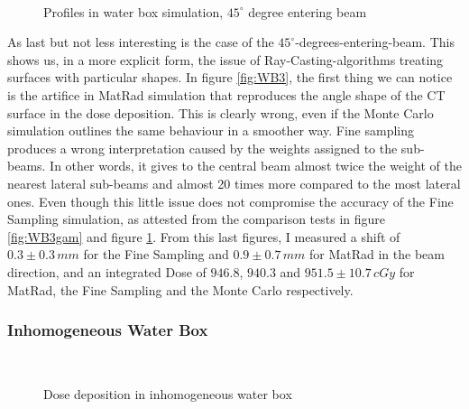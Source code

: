 \documentclass[12pt, a4paper, twoside]{book}
\begin{document}
\begin{figure}[!ht]
\centering
{} 
 \\
\caption{Profiles in water box simulation, $45^\circ$ degree entering beam}
\label{fig:WB3prof}
\end{figure}

As last but not less interesting is the case of the $45^\circ$-degrees-entering-beam. This shows us, in a more explicit form, the issue of Ray-Casting-algorithms treating surfaces with particular shapes. In figure \ref{fig:WB3}, the first thing we can notice is the artifice in MatRad simulation that reproduces the angle shape of the CT surface in the dose deposition. This is clearly wrong, even if the Monte Carlo simulation outlines the same behaviour in a smoother way. Fine sampling produces a wrong interpretation caused by the weights assigned to the sub-beams. In other words, it gives to the central beam almost twice the weight of the nearest lateral sub-beams and almost 20 times more compared to the most lateral ones.
Even though this little issue does not compromise the accuracy of the Fine Sampling simulation, as attested from the comparison tests in figure \ref{fig:WB3gam} and figure \ref{fig:WB3prof}. From this last figures, I measured a shift of $0.3\pm0.3\,mm$ for the Fine Sampling and $0.9\pm0.7\,mm$ for MatRad in the beam direction, and an integrated Dose of $946.8$, $940.3$ and $951.5\pm10.7\,cGy$ for MatRad, the Fine Sampling and the Monte Carlo respectively.

\subsubsection{Inhomogeneous Water Box}
\begin{figure}[!t] 
\centering
{}\quad
{}\\
\quad
{}
\caption{Dose deposition in inhomogeneous water box}
\label{fig:HWB1}
\end{figure}
\end{document}
